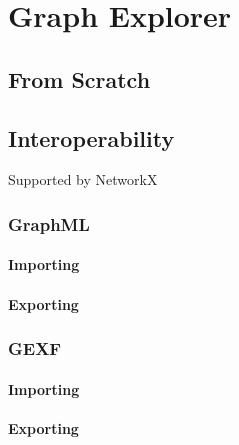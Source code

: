 \section{Graph Explorer}
\label{sec:graph-builder}

\subsection{From Scratch}
\subsection{Interoperability}
Supported by NetworkX~\parencite{hagberg:networkx}
\subsubsection{GraphML}
\paragraph{Importing}
\paragraph{Exporting}

\subsubsection{GEXF}
\paragraph{Importing}
\paragraph{Exporting}

